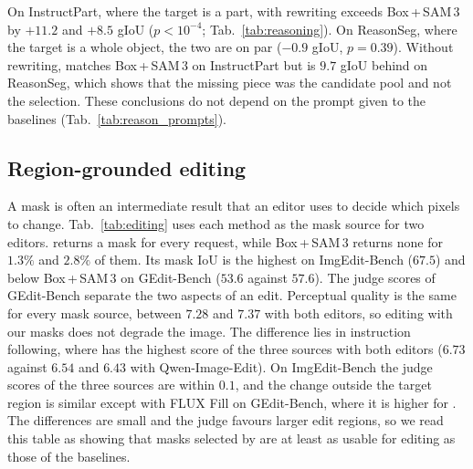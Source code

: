 On InstructPart, where the target is a part, \ours{} with rewriting exceeds Box\,+\,SAM\,3 by $+11.2$ and $+8.5$
gIoU ($p<10^{-4}$; Tab.~\ref{tab:reasoning}). On ReasonSeg, where the target is a whole object, the two are on par
($-0.9$ gIoU, $p=0.39$). Without rewriting, \ours{} matches Box\,+\,SAM\,3 on InstructPart but is $9.7$ gIoU behind
on ReasonSeg, which shows that the missing piece was the candidate pool and not the selection. These conclusions
do not depend on the prompt given to the baselines (Tab.~\ref{tab:reason_prompts}).

\subsection{Region-grounded editing}
\label{sec:editing}

A mask is often an intermediate result that an editor uses to decide which pixels to change.
Tab.~\ref{tab:editing} uses each method as the mask source for two editors. \ours{} returns a mask for every
request, while Box\,+\,SAM\,3 returns none for $1.3\%$ and $2.8\%$ of them. Its mask IoU is the highest on
ImgEdit-Bench ($67.5$) and below Box\,+\,SAM\,3 on GEdit-Bench ($53.6$ against $57.6$). The judge scores of
GEdit-Bench separate the two aspects of an edit. Perceptual quality is the same for every mask source, between
$7.28$ and $7.37$ with both editors, so editing with our masks does not degrade the image. The difference lies in
instruction following, where \ours{} has the highest score of the three sources with both editors ($6.73$ against
$6.54$ and $6.43$ with Qwen-Image-Edit). On ImgEdit-Bench the judge scores of the three sources are within
$0.1$, and the change outside the target region is similar except with FLUX Fill on GEdit-Bench, where it is
higher for \ours{}. The differences are small and the judge favours larger edit regions, so we read this table as
showing that masks selected by \ours{} are at least as usable for editing as those of the baselines.
